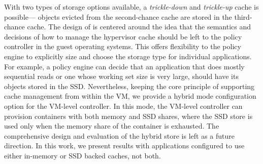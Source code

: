 With two types of storage options available,
a \emph{trickle-down} and \emph{trickle-up} cache is possible---
objects evicted from the second-chance cache are stored
in the third-chance cache.
%
The design of \dd{} is centered around the idea that the
semantics and decisions of how to manage the hypervisor cache
should be left to the policy controller in the guest
operating systems.
%
This offers flexibility to the policy engine to explicitly 
size and choose the storage type for individual applications.
%
For example, a policy engine can decide that an application
that does mostly sequential reads or one whose working set
size is very large, should have its objects stored in 
the SSD.
%
%
Nevertheless, keeping the core principle of supporting cache management from 
within the VM, we provide a hybrid mode configuration option for the
VM-level controller.
%
In this mode, the VM-level controller can provision containers 
with both memory and SSD shares, where the SSD store is used only when the
memory share of the container is exhausted. 
%
The comprehensive design and evaluation of the hybrid store
is left as a future direction. 
%
In this work, we present
results with applications configured to use either in-memory
or SSD backed caches, not both.
%
%
%
%

